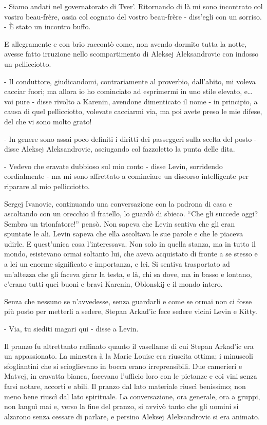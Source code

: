 - Siamo andati nel governatorato di Tver'. Ritornando di là mi sono incontrato col vostro beau-frère, ossia col cognato del vostro beau-frère - diss'egli con un sorriso. - È stato un incontro buffo. 

E allegramente e con brio raccontò come, non avendo dormito tutta la notte, avesse fatto irruzione nello scompartimento di Aleksej Aleksandrovic con indosso un pellicciotto. 

- Il conduttore, giudicandomi, contrariamente al proverbio, dall'abito, mi voleva cacciar fuori; ma allora io ho cominciato ad esprimermi in uno stile elevato, e\ldots{} voi pure - disse rivolto a Karenin, avendone dimenticato il nome - in principio, a causa di quel pellicciotto, volevate cacciarmi via, ma poi avete preso le mie difese, del che vi sono molto grato! 

- In genere sono assai poco definiti i diritti dei passeggeri sulla scelta del posto - disse Aleksej Aleksandrovic, asciugando col fazzoletto la punta delle dita. 

- Vedevo che eravate dubbioso sul mio conto - disse Levin, sorridendo cordialmente - ma mi sono affrettato a cominciare un discorso intelligente per riparare al mio pellicciotto. 

Sergej Ivanovic, continuando una conversazione con la padrona di casa e ascoltando con un orecchio il fratello, lo guardò di sbieco. ``Che gli succede oggi? Sembra un trionfatore!'' pensò. Non sapeva che Levin sentiva che gli eran spuntate le ali. Levin sapeva che ella ascoltava le sue parole e che le piaceva udirle. E quest'unica cosa l'interessava. Non solo in quella stanza, ma in tutto il mondo, esistevano ormai soltanto lui, che aveva acquistato di fronte a se stesso e a lei un enorme significato e importanza, e lei. Si sentiva trasportato ad un'altezza che gli faceva girar la testa, e là, chi sa dove, ma in basso e lontano, c'erano tutti quei buoni e bravi Karenin, Oblonskij e il mondo intero. 

Senza che nessuno se n'avvedesse, senza guardarli e come se ormai non ci fosse più posto per metterli a sedere, Stepan Arkad'ic fece sedere vicini Levin e Kitty. 

- Via, tu siediti magari qui - disse a Levin. 
\enlargethispage*{1\baselineskip}

Il pranzo fu altrettanto raffinato quanto il vasellame di cui Stepan Arkad'ic era un appassionato. La minestra à la Marie Louise era riuscita ottima; i minuscoli sfogliantini che si scioglievano in bocca erano irreprensibili. Due camerieri e Matvej, in cravatta bianca, facevano l'ufficio loro con le pietanze e coi vini senza farsi notare, accorti e abili. Il pranzo dal lato materiale riuscì benissimo; non meno bene riuscì dal lato spirituale. La conversazione, ora generale, ora a gruppi, non languì mai e, verso la fine del pranzo, si avvivò tanto che gli uomini si alzarono senza cessare di parlare, e persino Aleksej Aleksandrovic si era animato. 

